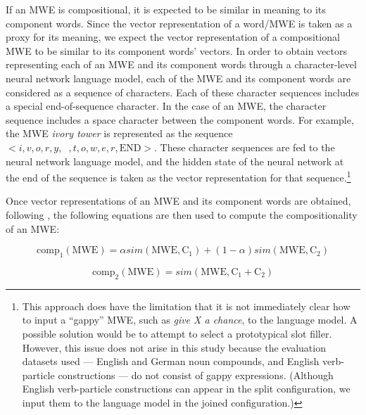 \documentclass[11pt]{article}
\begin{document}
If an MWE is compositional, it is expected to be similar in meaning to
its component words. Since the vector representation of a word/MWE is
taken as a proxy for its meaning, we expect the vector representation
of a compositional MWE to be similar to its component words'
vectors. In order to obtain vectors representing each of an MWE and
its component words through a character-level neural network language
model, each of the MWE and its component words are considered as a
sequence of characters. Each of these character sequences includes a
special end-of-sequence character. In the case of an MWE, the
character sequence includes a space character between the component
words. For example, the MWE \emph{ivory tower} is represented as the
sequence $<i,v,o,r,y,\phantom{x},t,o,w,e,r,\textrm{END}>$. These
character sequences are fed to the neural network language model, and
the hidden state of the neural network at the end of the sequence is
taken as the vector representation for that sequence.\footnote{This
  approach does have the limitation that it is not immediately clear
  how to input a ``gappy'' MWE, such as \emph{give X a chance}, to the
  language model. A possible solution would be to attempt to select a
  prototypical slot filler. However, this issue does not arise in this
  study because the evaluation datasets used --- English and German
  noun compounds, and English verb-particle constructions --- do not
  consist of gappy expressions. (Although English verb-particle
  constructions can appear in the split configuration, we input them
  to the language model in the joined configuration.)}


Once vector representations of an MWE and its component words are
obtained, following \cite{Salehi+:2015}, the following equations are
then used to compute the compositionality of an MWE:

\begin{equation}
\mathrm{comp}_{1}(\mathrm{MWE})=\alpha
sim(\mathrm{MWE},\mathrm{C}_{1})+(1-\alpha)sim(\mathrm{MWE},\mathrm{C}_{2})
\label{eq:comp1}
\end{equation}

\begin{equation}
\mathrm{comp}_{2}(\mathrm{MWE})=sim(\mathrm{MWE},\mathrm{C}_{1}+\mathrm{C}_{2})
\label{eq:comp2}
\end{equation}
\end{document}
